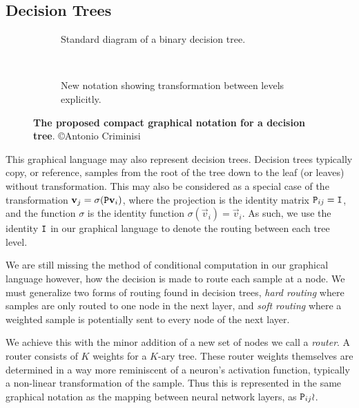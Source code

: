 \documentclass[thesis]{subfiles}
\begin{document}
\subsection{Decision Trees}
\begin{figure}[htbp!] 
\centering
\begin{subfigure}[b]{0.45\textwidth}
   \caption{Standard diagram of a binary decision tree.}
\end{subfigure}
~
\begin{subfigure}[b]{0.4\textwidth}
   \caption{New notation showing transformation between levels explicitly.}
\end{subfigure}
\caption[New graphical notation for a binary decision tree.]{{\bf The proposed compact graphical notation for a decision tree}. \copyright Antonio Criminisi}
\label{fig:decisionTree}
\end{figure}

This graphical language may also represent decision trees. Decision trees typically copy, or reference, samples from the root of the tree down to the leaf (or leaves) without transformation. This may also be considered as a special case of the transformation $\vec v_j = \sigma(\mat P \vec v_i)$, where the projection is the identity matrix $\mat P_{ij} = \mat I$, and the function $\sigma$ is the identity function $\sigma(\vec v_i) = \vec v_i$. As such, we use the identity $\mat I$ in our graphical language to denote the routing between each tree level. 

We are still missing the method of conditional computation in our graphical language however, \ie how the decision is made to route each sample at a node. We must generalize two forms of routing found in decision trees, \emph{hard routing} where samples are only routed to one node in the next layer, and \emph{soft routing} where a weighted sample is potentially sent to every node of the next layer.

We achieve this with the minor addition of a new set of nodes we call a \emph{router}. A router consists of $K$ weights for a $K$-ary tree. These router weights themselves are determined in a way more reminiscent of a neuron's activation function, typically a non-linear transformation of the sample. Thus this is represented in the same graphical notation as the mapping between neural network layers, \ie as $\mat P_{ij} \wr$.
\end{document}
